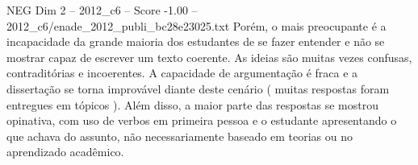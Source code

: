 \begin{textsample}{NEG Dim 2 – 2012\_c6 – Score -1.00 – 2012\_c6/enade\_2012\_publi\_bc28e23025.txt}
Porém, o mais preocupante é a incapacidade da grande maioria dos estudantes de se fazer entender e não se mostrar capaz de escrever um texto coerente.
As ideias são muitas vezes confusas, contraditórias e incoerentes.
A capacidade de argumentação é fraca e a dissertação se torna improvável diante deste cenário ( muitas respostas foram entregues em tópicos ).
Além disso, a maior parte das respostas se mostrou opinativa, com uso de verbos em primeira pessoa e o estudante apresentando o que achava do assunto, não necessariamente baseado em teorias ou no aprendizado acadêmico.

\end{textsample}
